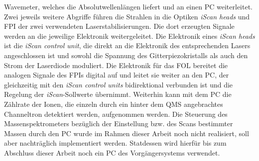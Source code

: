 Wavemeter, welches die Absolutwellenlängen liefert und an einen PC weiterleitet.
Zwei jeweils weitere Abgriffe führen die Strahlen in die Optiken \textit{iScan
heads} und FPI der zwei verwendeten Laserstabilisierungen. Die dort erzeugten
Signale werden an die jeweilige Elektronik weitergeleitet. Die Elektronik eines
\textit{iScan heads} ist die \textit{iScan control unit}, die direkt an die
Elektronik des entsprechenden Lasers angeschlossen ist und sowohl die Spannung
des Gitterpiezokristalls als auch den Strom der Laserdiode moduliert. Die
Elektronik für das FOL bereitet die analogen Signale des FPIs digital auf und
leitet sie weiter an den PC, der gleichzeitig mit den \textit{iScan control units} bidirektional
verbunden ist und die Regelung der \textit{iScan}-Sollwerte übernimmt. Weiterhin
kann mit dem PC die Zählrate der Ionen, die einzeln durch ein hinter dem QMS
angebrachtes Channeltron detektiert werden, aufgenommen werden. Die Steuerung
des Massenspektrometers bezüglich der Einstellung bzw. des Scans bestimmter
Massen durch den PC wurde im Rahmen dieser Arbeit noch nicht realisiert, soll aber
nachträglich implementiert werden. Statdessen wird hierfür bis zum Abschluss
dieser Arbeit noch ein PC des Vorgängersystems verwendet.

